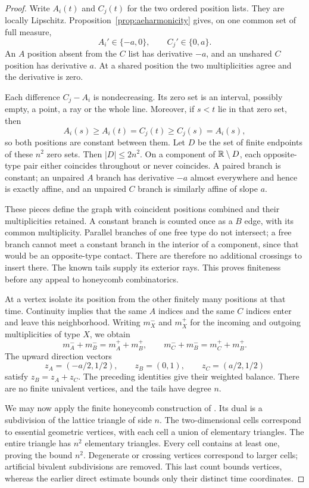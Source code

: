 \begin{proof}
Write $A_i(t)$ and $C_j(t)$ for the two ordered position lists.
They are locally Lipschitz. Proposition~\ref{prop:aeharmonicity}
gives, on one common set of full measure,
\[
 A_i'\in\{-a,0\},\qquad C_j'\in\{0,a\}.
\]
An $A$ position absent from the $C$ list has derivative $-a$,
and an unshared $C$ position has derivative $a$. At a shared
position the two multiplicities agree and the derivative is zero.

Each difference $C_j-A_i$ is nondecreasing. Its zero set is an
interval, possibly empty, a point, a ray or the whole line.
Moreover, if $s<t$ lie in that zero set, then
\[
 A_i(s)\ge A_i(t)=C_j(t)\ge C_j(s)=A_i(s),
\]
so both positions are constant between them. Let $D$ be the set
of finite endpoints of these $n^2$ zero sets. Then $|D|\le2n^2$.
On a component of $\mathbb R\setminus D$, each opposite-type pair
either coincides throughout or never coincides. A paired branch
is constant; an unpaired $A$ branch has derivative $-a$ almost
everywhere and hence is exactly affine, and an unpaired $C$
branch is similarly affine of slope $a$.

These pieces define the graph with coincident positions combined
and their multiplicities retained. A constant branch is counted
once as a $B$ edge, with its common multiplicity. Parallel branches
of one free type do not intersect; a free branch cannot meet a
constant branch in the interior of a component, since that would
be an opposite-type contact. There are therefore no additional
crossings to insert there. The known tails supply its exterior
rays. This proves finiteness before any appeal to honeycomb
combinatorics.

At a vertex isolate its position from the other finitely many
positions at that time. Continuity implies that the same $A$
indices and the same $C$ indices enter and leave this neighborhood.
Writing $m_X^-$ and $m_X^+$ for the incoming and outgoing
multiplicities of type $X$, we obtain
\[
 m_A^-+m_B^-=m_A^++m_B^+,\qquad
 m_C^-+m_B^-=m_C^++m_B^+.
\]
The upward direction vectors
\[
 z_A=(-a/2,1/2),\qquad z_B=(0,1),\qquad z_C=(a/2,1/2)
\]
satisfy $z_B=z_A+z_C$. The preceding identities give their
weighted balance. There are no finite univalent vertices, and
the tails have degree $n$.

We may now apply the finite honeycomb construction of
\cite[\S3.1, Lemmas~4 and 6--8, and Theorem~1]{KT99}.
Its dual is a subdivision of the lattice triangle of side $n$.
The two-dimensional cells correspond to essential geometric
vertices, with each cell a union of elementary triangles.
The entire triangle has $n^2$ elementary triangles. Every cell
contains at least one, proving the bound $n^2$.
Degenerate or crossing vertices correspond to larger cells;
artificial bivalent subdivisions are removed. This last count
bounds vertices, whereas the earlier direct estimate bounds
only their distinct time coordinates.
\end{proof}

